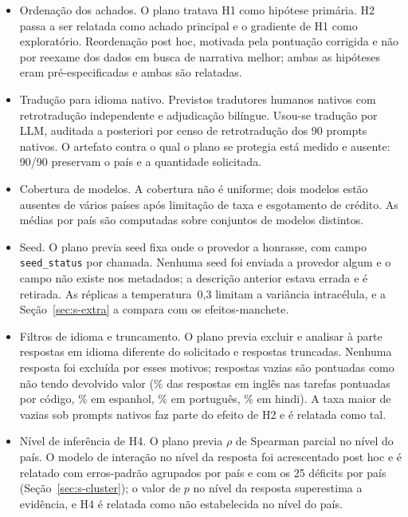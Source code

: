 \documentclass[11pt,a4paper]{article}
\begin{document}
\begin{itemize}
  77bca4679aedc93a). A comparação entre tiers em T1 é reportada com e sem os três países sem
  padrão (\nort{} e \nortexcl) e sob a chave tolerante à escada (\nortladder).
\item Ordenação dos achados. O plano tratava H1 como hipótese primária. H2
  passa a ser relatada como achado principal e o gradiente de H1 como exploratório.
  Reordenação post hoc, motivada pela pontuação corrigida e não por reexame dos
  dados em busca de narrativa melhor; ambas as hipóteses eram pré-especificadas e
  ambas são relatadas.
\item Tradução para idioma nativo. Previstos tradutores humanos nativos com
  retrotradução independente e adjudicação bilíngue. Usou-se tradução por LLM,
  auditada a posteriori por censo de retrotradução dos 90 prompts nativos. O
  artefato contra o qual o plano se protegia está medido e ausente: 90/90 preservam
  o país e a quantidade solicitada.
\item Cobertura de modelos. A cobertura não é uniforme; dois modelos estão
  ausentes de vários países após limitação de taxa e esgotamento de crédito. As
  médias por país são computadas sobre conjuntos de modelos distintos.
\item Seed. O plano previa seed fixa onde o provedor a honrasse, com campo
  \texttt{seed\_status} por chamada. Nenhuma seed foi enviada a provedor
  algum e o campo não existe nos metadados; a descrição anterior estava errada
  e é retirada. As réplicas a temperatura~0,3 limitam a variância intracélula, e
  a Seção~\ref{sec:s-extra} a compara com os efeitos-manchete.
\item Filtros de idioma e truncamento. O plano previa excluir e analisar à parte
  respostas em idioma diferente do solicitado e respostas truncadas. Nenhuma
  resposta foi excluída por esses motivos; respostas vazias são pontuadas como
  não tendo devolvido valor (\nemptyen\% das respostas em inglês nas tarefas
  pontuadas por código, \nemptyes\% em espanhol, \nemptypt\% em português,
  \nemptyhi\% em hindi). A taxa maior de vazias sob prompts nativos faz parte do
  efeito de H2 e é relatada como tal.
\item Nível de inferência de H4. O plano previa $\rho$ de Spearman parcial no
  nível do país. O modelo de interação no nível da resposta foi acrescentado
  post hoc e é relatado com erros-padrão agrupados por país e com os 25
  déficits por país (Seção~\ref{sec:s-cluster}); o valor de $p$ no nível da
  resposta superestima a evidência, e H4 é relatada como não estabelecida no
  nível do país.
\end{itemize}
\end{document}
